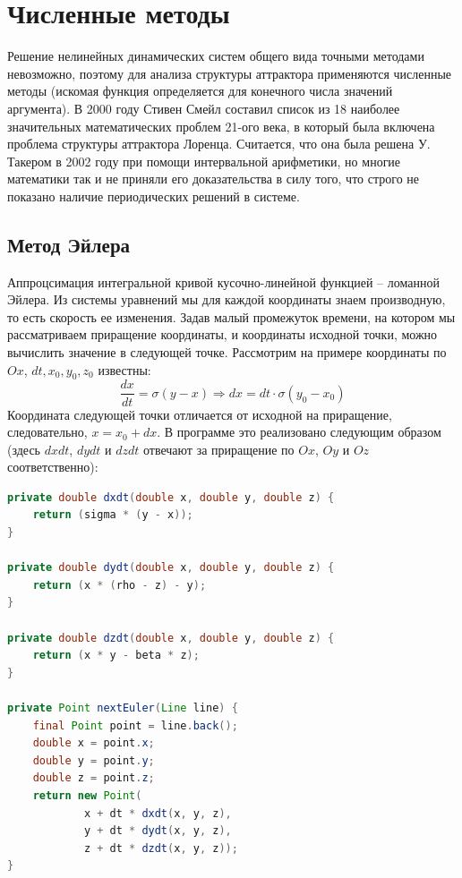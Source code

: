 \documentclass[12pt]{article}
\begin{document}
\section{Численные методы}

Решение нелинейных динамических систем общего вида точными методами невозможно, поэтому для анализа структуры аттрактора применяются численные методы (искомая функция определяется для конечного числа значений аргумента). В 2000 году Стивен Смейл составил список из 18 наиболее значительных математических проблем 21-ого века, в который была включена проблема структуры аттрактора Лоренца. Считается, что она была решена У. Такером в 2002 году при помощи интервальной арифметики, но многие математики так и не приняли его доказательства в силу того, что строго не показано наличие периодических решений в системе.

\subsection{Метод Эйлера}

Аппроцсимация интегральной кривой кусочно-линейной функцией -- ломанной Эйлера. Из системы уравнений мы для каждой координаты знаем производную, то есть скорость ее изменения. Задав малый промежуток времени, на котором мы рассматриваем приращение координаты, и координаты исходной точки, можно вычислить значение в следующей точке. Рассмотрим на примере координаты по $Ox$, $dt, x_0, y_0, z_0$ известны:
\begin{equation*}
\frac{dx}{dt} = \sigma (y-x) \Rightarrow dx = dt \cdot \sigma (y_0-x_0)
\end{equation*}
Координата следующей точки отличается от исходной на приращение, следовательно, $x = x_0 + dx$. В программе это реализовано следующим образом (здесь $dxdt$, $dydt$ и $dzdt$ отвечают за приращение по $Ox$, $Oy$ и $Oz$ соответственно):

\begin{lstlisting}[language=Java]
private double dxdt(double x, double y, double z) {
	return (sigma * (y - x));
}

private double dydt(double x, double y, double z) {
	return (x * (rho - z) - y);
}

private double dzdt(double x, double y, double z) {
    return (x * y - beta * z);
}

private Point nextEuler(Line line) {
	final Point point = line.back();
    double x = point.x;
    double y = point.y;
    double z = point.z;
    return new Point(
    		x + dt * dxdt(x, y, z),
            y + dt * dydt(x, y, z),
            z + dt * dzdt(x, y, z));
}
\end{lstlisting}
\end{document}
